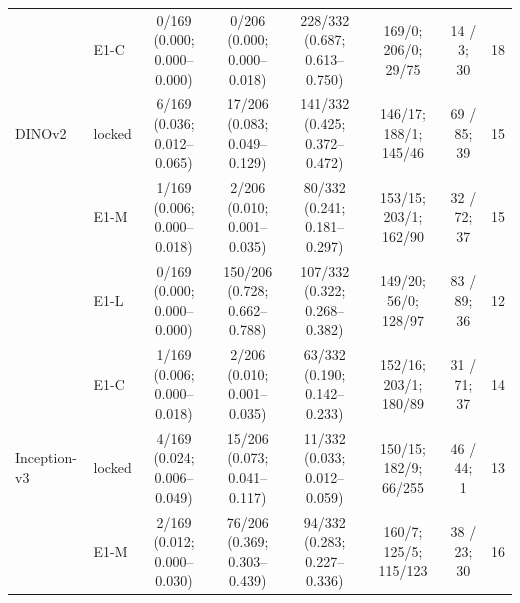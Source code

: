 \begin{tabular}{@{}llcccccc@{}}
 & E1-C & \makecell{0/169\\{\scriptsize (0.000; 0.000--0.000)}} & \makecell{0/206\\{\scriptsize (0.000; 0.000--0.018)}} & \makecell{228/332\\{\scriptsize (0.687; 0.613--0.750)}} & 169/0; 206/0; 29/75 & 14 / 3; 30 & 18 \\
\addlinespace[2pt]
DINOv2 & locked & \makecell{6/169\\{\scriptsize (0.036; 0.012--0.065)}} & \makecell{17/206\\{\scriptsize (0.083; 0.049--0.129)}} & \makecell{141/332\\{\scriptsize (0.425; 0.372--0.472)}} & 146/17; 188/1; 145/46 & 69 / 85; 39 & 15 \\
 & E1-M & \makecell{1/169\\{\scriptsize (0.006; 0.000--0.018)}} & \makecell{2/206\\{\scriptsize (0.010; 0.001--0.035)}} & \makecell{80/332\\{\scriptsize (0.241; 0.181--0.297)}} & 153/15; 203/1; 162/90 & 32 / 72; 37 & 15 \\
 & E1-L & \makecell{0/169\\{\scriptsize (0.000; 0.000--0.000)}} & \makecell{150/206\\{\scriptsize (0.728; 0.662--0.788)}} & \makecell{107/332\\{\scriptsize (0.322; 0.268--0.382)}} & 149/20; 56/0; 128/97 & 83 / 89; 36 & 12 \\
 & E1-C & \makecell{1/169\\{\scriptsize (0.006; 0.000--0.018)}} & \makecell{2/206\\{\scriptsize (0.010; 0.001--0.035)}} & \makecell{63/332\\{\scriptsize (0.190; 0.142--0.233)}} & 152/16; 203/1; 180/89 & 31 / 71; 37 & 14 \\
\addlinespace[2pt]
Inception-v3 & locked & \makecell{4/169\\{\scriptsize (0.024; 0.006--0.049)}} & \makecell{15/206\\{\scriptsize (0.073; 0.041--0.117)}} & \makecell{11/332\\{\scriptsize (0.033; 0.012--0.059)}} & 150/15; 182/9; 66/255 & 46 / 44; 1 & 13 \\
 & E1-M & \makecell{2/169\\{\scriptsize (0.012; 0.000--0.030)}} & \makecell{76/206\\{\scriptsize (0.369; 0.303--0.439)}} & \makecell{94/332\\{\scriptsize (0.283; 0.227--0.336)}} & 160/7; 125/5; 115/123 & 38 / 23; 30 & 16 \\

\end{tabular}
